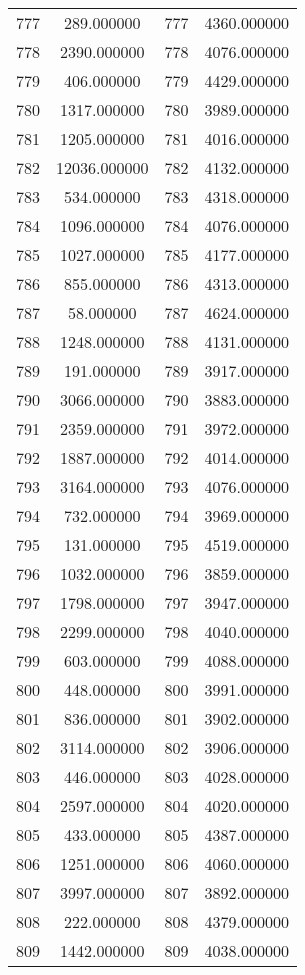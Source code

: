 \documentclass[12pt]{article}
\begin{document}
\begin{longtable}{@{}cccc@{}}
777 & 289.000000 & 777 & 4360.000000 \\
778 & 2390.000000 & 778 & 4076.000000 \\
779 & 406.000000 & 779 & 4429.000000 \\
780 & 1317.000000 & 780 & 3989.000000 \\
781 & 1205.000000 & 781 & 4016.000000 \\
782 & 12036.000000 & 782 & 4132.000000 \\
783 & 534.000000 & 783 & 4318.000000 \\
784 & 1096.000000 & 784 & 4076.000000 \\
785 & 1027.000000 & 785 & 4177.000000 \\
786 & 855.000000 & 786 & 4313.000000 \\
787 & 58.000000 & 787 & 4624.000000 \\
788 & 1248.000000 & 788 & 4131.000000 \\
789 & 191.000000 & 789 & 3917.000000 \\
790 & 3066.000000 & 790 & 3883.000000 \\
791 & 2359.000000 & 791 & 3972.000000 \\
792 & 1887.000000 & 792 & 4014.000000 \\
793 & 3164.000000 & 793 & 4076.000000 \\
794 & 732.000000 & 794 & 3969.000000 \\
795 & 131.000000 & 795 & 4519.000000 \\
796 & 1032.000000 & 796 & 3859.000000 \\
797 & 1798.000000 & 797 & 3947.000000 \\
798 & 2299.000000 & 798 & 4040.000000 \\
799 & 603.000000 & 799 & 4088.000000 \\
800 & 448.000000 & 800 & 3991.000000 \\
801 & 836.000000 & 801 & 3902.000000 \\
802 & 3114.000000 & 802 & 3906.000000 \\
803 & 446.000000 & 803 & 4028.000000 \\
804 & 2597.000000 & 804 & 4020.000000 \\
805 & 433.000000 & 805 & 4387.000000 \\
806 & 1251.000000 & 806 & 4060.000000 \\
807 & 3997.000000 & 807 & 3892.000000 \\
808 & 222.000000 & 808 & 4379.000000 \\
809 & 1442.000000 & 809 & 4038.000000 \\

\end{longtable}
\end{document}
